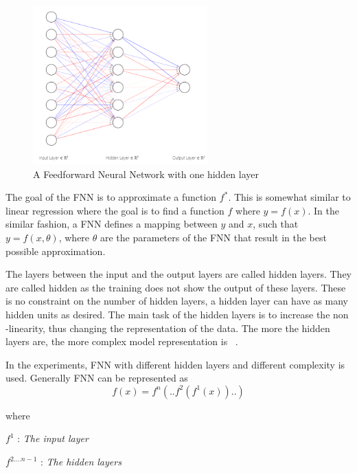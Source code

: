 \begin{figure}[ht]
  \begin{center}
    \includegraphics[width=0.60\textwidth]{Master's thesis/images/fnn.PNG} 
    \caption{A Feedforward Neural Network with one hidden layer}
    \label{fig:FNN}
  \end{center}
\end{figure}  

The goal of the FNN is to approximate a function \(f^{*}\). This is somewhat similar to linear regression where the goal is to find a function  \(f\) where  \(y= f(x)\). In the similar fashion, a FNN defines a mapping between \(y\) and \(x\), such that \(y= f(x, \theta) \), where $\theta$ are the parameters of the FNN that result in the best possible approximation. 

The layers between the input and the output layers are called hidden layers. They are called hidden as the training does not show the output of these layers. These is no constraint on the number of hidden layers, a hidden layer can have as many hidden units as desired. The main task of the hidden layers is to increase the non -linearity, thus changing the representation of the data. The more the hidden layers are, the more complex model representation is ~\cite{Goodfellow-et-al-2016}.

In the experiments, FNN with different hidden layers and different complexity is used. Generally FNN can be represented as 
\begin{equation}\label{eq:fnn}
f(x) = f^{n}(..f^{2}(f^{1}(x))..)
\end{equation}

where

\(f^{1}\) : \textit{The input layer}

\(f^{2....n-1}\) : \textit{The hidden layers}

